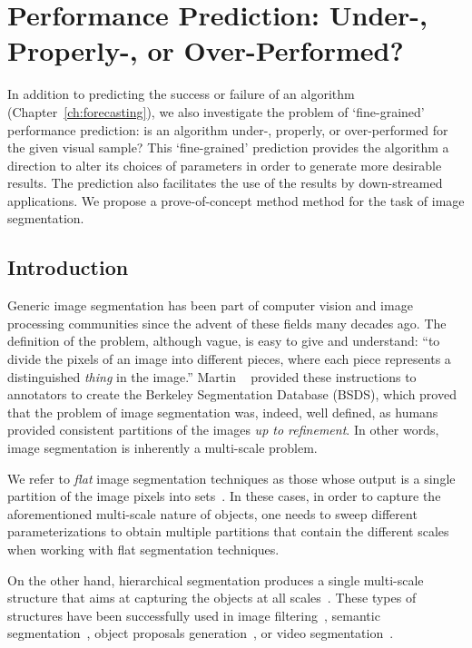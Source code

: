 \chapter{Performance Prediction: Under-, Properly-, or Over-Performed?}
\label{ch:scale-aware}

In addition to predicting the success or failure of an algorithm (Chapter~\ref{ch:forecasting}),  we also investigate the problem of `fine-grained' performance prediction: is an algorithm under-, properly, or over-performed for the given visual sample? This `fine-grained' prediction provides the algorithm a direction to alter its choices of parameters  in order to generate more desirable results. The prediction also facilitates the use of the results by down-streamed applications.  
We propose a prove-of-concept method method for the task of image segmentation.  

\section{Introduction}
\label{scale:sec:intro}
Generic image segmentation has been part of computer vision and image processing communities since the
advent of these fields many decades ago.
The definition of the problem, although vague, is easy to give and understand: ``to divide the pixels of an
image into different pieces, where each piece represents a distinguished \textit{thing}
in the image.''
Martin \etal~\citep{Martin2001} provided these instructions to annotators to create
the Berkeley Segmentation Database (BSDS), which proved that the problem of image segmentation was,
indeed, well defined, as humans provided consistent partitions of the images \textit{up to refinement}.
In other words, image segmentation is inherently a multi-scale problem.

We refer to \textit{flat} image segmentation techniques as those whose output is a single partition of the
image pixels into sets~\citep{shi2000normalized,Comaniciu2002,felzenszwalb2004efficient}.
In these cases, in order to capture the aforementioned multi-scale nature of objects,
one needs to sweep different parameterizations to obtain multiple partitions that contain the
different scales when working with flat segmentation techniques.

On the other hand, hierarchical segmentation produces a single multi-scale structure that aims
at capturing the objects at all scales~\citep{arbelaez2011contour,kim2013learning,Salembier2000,Ren2013,arbelaez2014multiscale}. 
These types of structures have been successfully used in image filtering~\citep{Salembier2000},
semantic segmentation~\citep{Lempitsky2011}, object proposals generation~\citep{arbelaez2014multiscale},
or video segmentation~\citep{xu2013flattening,Varas2015}.

